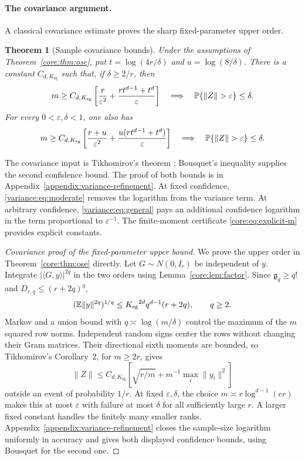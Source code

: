\documentclass[11pt,a4paper]{article}
\newtheorem{theorem}{Theorem}[section]
\theoremstyle{definition}\newtheorem{definition}[theorem]{Definition}
\theoremstyle{remark}\newtheorem{remark}[theorem]{Remark}
\numberwithin{equation}{section}
\newcommand{\Ksg}{{K_{\mathrm{sg}}}}\newcommand{\Cfour}{{C_4}}
\newcommand{\gmom}{\mathfrak g}
\newcommand{\norm}[1]{\lVert#1\rVert}\newcommand{\ip}[2]{\langle#1,#2\rangle}
\begin{document}
\paragraph{The covariance argument.}
A classical covariance estimate proves the sharp fixed-parameter
upper order.
\begin{theorem}[Sample covariance bounds]\label{variance:thm:refinement}
Under the assumptions of Theorem~\ref{core:thm:ose}, put
$t=\log(4r/\delta)$ and $u=\log(8/\delta)$.
There is a constant $C_{d,\Ksg}$ such that, if $\delta\ge2/r$, then
\begin{equation}\label{variance:eq:moderate}
 m\ge C_{d,\Ksg}\left[\frac r{\varepsilon^2}
       +\frac{rt^{d-1}+t^d}{\varepsilon}\right]
 \quad\Longrightarrow\quad\Pp\{\norm Z>\varepsilon\}\le\delta.
\end{equation}
For every $0<\varepsilon,\delta<1$, one also has
\begin{equation}\label{variance:eq:general}
 m\ge C_{d,\Ksg}\left[\frac{r+u}{\varepsilon^2}
       +\frac{u(rt^{d-1}+t^d)}{\varepsilon}\right]
 \quad\Longrightarrow\quad\Pp\{\norm Z>\varepsilon\}\le\delta.
\end{equation}
\end{theorem}
The covariance input is Tikhomirov's theorem
\cite[Corollary~2]{Tikhomirov2018}; Bousquet's inequality
\cite[Theorem~2.3]{Bousquet2002} supplies the second confidence bound.
The proof of both bounds is in Appendix~\ref{appendix:variance-refinement}.
At fixed confidence, \eqref{variance:eq:moderate} removes the logarithm
from the variance term. At arbitrary confidence,
\eqref{variance:eq:general} pays an additional confidence logarithm
in the term proportional to $\varepsilon^{-1}$.
The finite-moment certificate \eqref{core:eq:explicit-m} provides explicit constants.

\begin{proof}[Covariance proof of the fixed-parameter upper bound]
We prove the upper order in Theorem~\ref{core:thm:ose} directly.
Let $G\sim N(0,I_r)$ be independent of $y$. Integrate $|\ip Gy|^{2q}$
in the two orders using Lemma~\ref{core:lem:factor}. Since
$\gmom_q\ge q!$ and $D_{r,q}\le(r+2q)^q$,
\[
 (\E\norm y^{2q})^{1/q}\le\Ksg^{2d}q^{d-1}(r+2q),\qquad q\ge2.
\]
Markov and a union bound with $q\asymp\log(m/\delta)$ control the
maximum of the $m$ squared row norms. Independent random signs center
the rows without changing their Gram matrices. Their directional sixth
moments are bounded, so Tikhomirov's Corollary~2, for $m\ge2r$, gives
\[
 \norm Z\le C_{d,\Ksg}\left[\sqrt{r/m}
                  +m^{-1}\max_i\norm{y_i}^2\right]
\]
outside an event of probability $1/r$. At fixed $\varepsilon,\delta$,
the choice $m\asymp r\log^{d-1}(er)$ makes this at most
$\varepsilon$ with failure at most $\delta$ for all sufficiently
large $r$. A larger fixed constant handles the finitely many smaller
ranks. Appendix~\ref{appendix:variance-refinement} closes the
sample-size logarithm uniformly in accuracy and gives both displayed
confidence bounds, using Bousquet for the second one.
\end{proof}
\end{document}
